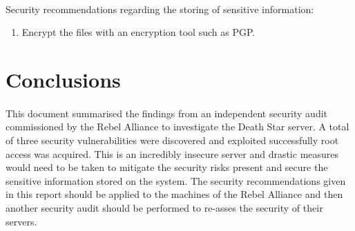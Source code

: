 \documentclass{article}
\begin{document}
\paragraph{}
\begin{adjustwidth}{1.5cm}{1.5cm}
	Security recommendations regarding the storing of sensitive information:
	\begin{enumerate}
		\item Encrypt the files with an encryption tool such as PGP.
	\end{enumerate}
\end{adjustwidth}
\newpage

\section{Conclusions}
\label{sec:conclusions}
\paragraph{}
This document summarised the findings from an independent security audit commissioned by the Rebel Alliance to investigate the Death Star server.
A total of three security vulnerabilities were discovered and exploited successfully root access was acquired.
This is an incredibly insecure server and drastic measures would need to be taken to mitigate the security risks present and secure the sensitive information stored on the system.
The security recommendations given in this report should be applied to the machines of the Rebel Alliance and then another security audit should be performed to re-asses the security of their servers.

\newpage
\printbibliography
\newpage
\end{document}
